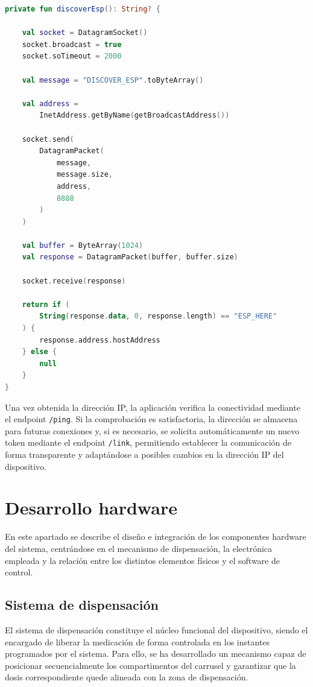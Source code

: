 \begin{lstlisting}[language=Kotlin, caption={Descubrimiento automático del dispositivo mediante difusión UDP}, label={cod:discover_esp}]
private fun discoverEsp(): String? {

    val socket = DatagramSocket()
    socket.broadcast = true
    socket.soTimeout = 2000

    val message = "DISCOVER_ESP".toByteArray()

    val address =
        InetAddress.getByName(getBroadcastAddress())

    socket.send(
        DatagramPacket(
            message,
            message.size,
            address,
            8888
        )
    )

    val buffer = ByteArray(1024)
    val response = DatagramPacket(buffer, buffer.size)

    socket.receive(response)

    return if (
        String(response.data, 0, response.length) == "ESP_HERE"
    ) {
        response.address.hostAddress
    } else {
        null
    }
}
\end{lstlisting}

Una vez obtenida la dirección IP, la aplicación verifica la conectividad mediante el endpoint \texttt{/ping}. Si la comprobación es satisfactoria, la dirección se almacena para futuras conexiones y, si es necesario, se solicita automáticamente un nuevo token mediante el endpoint \texttt{/link}, permitiendo establecer la comunicación de forma transparente y adaptándose a posibles cambios en la dirección IP del dispositivo.

\section{Desarrollo hardware}
\label{sec:desarrollo_hardware}

En este apartado se describe el diseño e integración de los componentes hardware del sistema, centrándose en el mecanismo de dispensación, la electrónica empleada y la relación entre los distintos elementos físicos y el software de control.

\subsection{Sistema de dispensación}
\label{sec}

El sistema de dispensación constituye el núcleo funcional del dispositivo, siendo el encargado de liberar la medicación de forma controlada en los instantes programados por el sistema. Para ello, se ha desarrollado un mecanismo capaz de posicionar secuencialmente los compartimentos del carrusel y garantizar que la dosis correspondiente quede alineada con la zona de dispensación.\\

